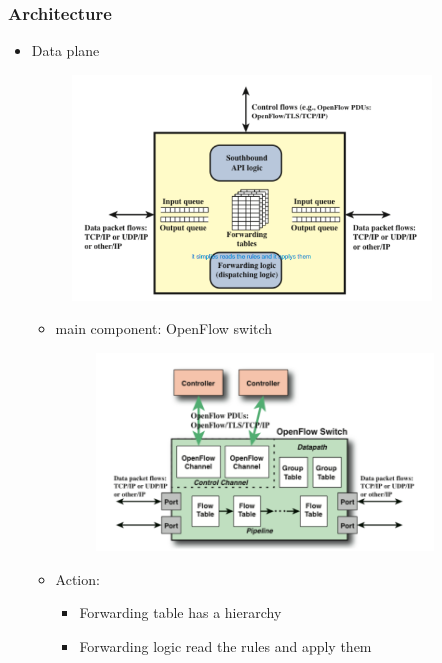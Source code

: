 \documentclass{article}
\begin{document}
\subsubsection{Architecture}
\begin{itemize}
    \item Data plane
    \begin{figure}[h]
    \centering
    \includegraphics[width=0.90\textwidth]{figure/data_plane.png}
\end{figure}
    \begin{itemize}
        \item main component: OpenFlow switch
        \begin{figure}[h]
            \centering
            \includegraphics[width=0.90\textwidth]{figure/OpenFLow_switch.png}
        \end{figure}
        \item Action: 
        \begin{itemize}
            \item Forwarding table has a hierarchy
            \item Forwarding logic read the rules and apply them

\end{itemize}
\end{itemize}
\end{itemize}
\end{document}
